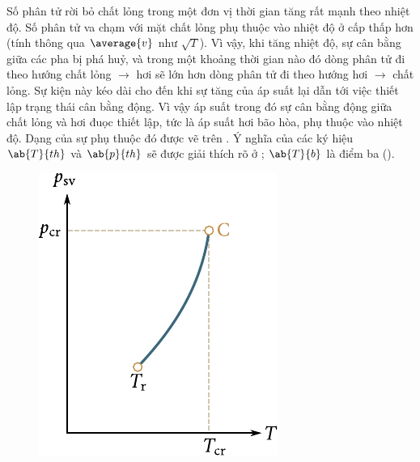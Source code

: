 Số phân tử rời bỏ chất lỏng trong một đơn vị thời gian tăng rất mạnh theo nhiệt độ. Số phân tử va chạm với mặt chất lỏng phụ thuộc vào nhiệt độ ở cấp thấp hơn (tính thông qua $\average{v}$ như $\sqrt{T}$). Vì vậy, khi tăng nhiệt độ, sự cân bằng giữa các pha bị phá huỷ, và trong một khoảng thời gian nào đó dòng phân tử đi theo hướng chất lỏng $\to$ hơi sẽ lớn hơn dòng phân tử đi theo hướng hơi $\to$ chất lỏng. Sự kiện này kéo dài cho đến khi sự tăng của áp suất lại dẫn tới việc thiết lập trạng thái cân bằng động. Vì vậy áp suất trong đó sự cân bằng động giữa chất lỏng và hơi đuọc thiết lập, tức là áp suất hơi bão hòa, phụ thuộc vào nhiệt độ. Dạng của sự phụ thuộc đó được vẽ trên . Ý nghĩa của các ký hiệu $\ab{T}{th}$ và $\ab{p}{th}$ sẽ được giải thích rõ ở ; $\ab{T}{b}$ là điểm ba ().

\begin{figure}[!htb]
	\begin{center}
		\includegraphics[scale=0.95]{figures/ch_15/fig_15_2.pdf}
		\caption[]{}
		\label{fig:15_2}
	\end{center}
	\vspace{-0.8cm}
\end{figure}

